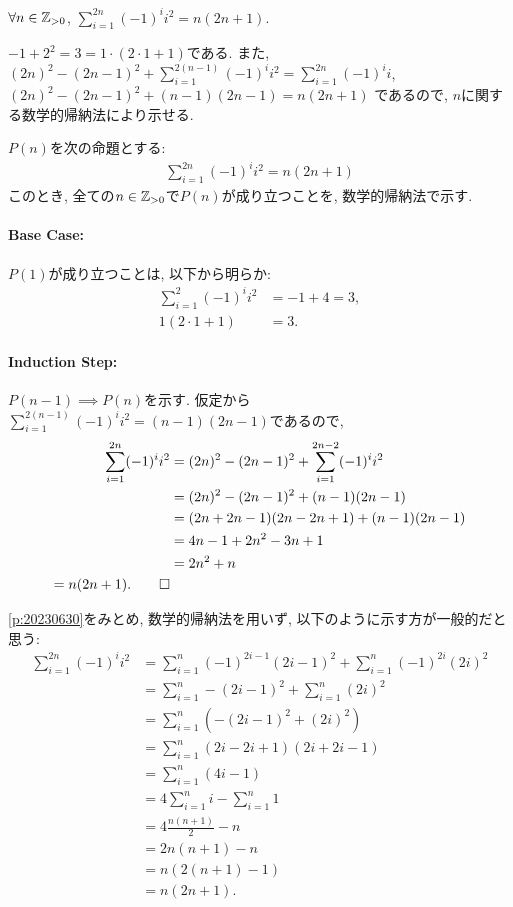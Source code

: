 \begin{prop}
  \label{p:20230709}
  $\forall n\in\mathbb{Z}_{>0}$, $\sum_{i=1}^{2n}(-1)^ii^2=n(2n+1)$.
\end{prop}
\begin{proof**}
  $-1+2^2=3=1\cdot (2\cdot 1+1)$である.
  また,
    $(2n)^2-(2n-1)^2+\sum_{i=1}^{2(n-1)}(-1)^ii^2=\sum_{i=1}^{2n}(-1)^ii$,
    $(2n)^2-(2n-1)^2+(n-1)(2n-1)=n(2n+1)$
  であるので,
  $n$に関する数学的帰納法により示せる.
\end{proof**}
\begin{proof*}
  $P(n)$を次の命題とする:
  \begin{align*}
    \sum_{i=1}^{2n}(-1)^ii^2=n(2n+1)
  \end{align*}
  このとき,
  全ての$n\in\mathbb{Z}_{>0}$で$P(n)$が成り立つことを,
  数学的帰納法で示す.

  \paragraph{Base Case:}
  $P(1)$が成り立つことは, 以下から明らか:
  \begin{align*}
    \sum_{i=1}^{2}(-1)^ii^2&=-1+4=3,\\
    1(2\cdot 1+1)&=3.
  \end{align*}

  \paragraph{Induction Step:}
  $P(n-1)\implies P(n)$を示す.
  仮定から$\sum_{i=1}^{2(n-1)}(-1)^ii^2=(n-1)(2n-1)$であるので,
  \begin{align*}
    \sum_{i=1}^{2n}(-1)^ii^2&=(2n)^2-(2n-1)^2+\sum_{i=1}^{2n-2}(-1)^ii^2\\
    &=(2n)^2-(2n-1)^2+(n-1)(2n-1)\\
    &=(2n+2n-1)(2n-2n+1)+(n-1)(2n-1)\\
    &=4n-1+2n^2-3n+1\\
    &=2n^2+n\\
    =n(2n+1)
    .\qedhere
  \end{align*}
\end{proof*}

\begin{rem}
  \cref{p:20230630}をみとめ,
  数学的帰納法を用いず, 以下のように示す方が一般的だと思う:
  \begin{align*}
    \sum_{i=1}^{2n}(-1)^ii^2
    &=\sum_{i=1}^{n}(-1)^{2i-1}(2i-1)^2+\sum_{i=1}^{n}(-1)^{2i}(2i)^2\\
    &=\sum_{i=1}^{n}-(2i-1)^2+\sum_{i=1}^{n}(2i)^2\\
    &=\sum_{i=1}^{n}(-(2i-1)^2+(2i)^2)\\
    &=\sum_{i=1}^{n}(2i-2i+1)(2i+2i-1)\\
    &=\sum_{i=1}^{n}(4i-1)\\
    &=4\sum_{i=1}^{n}i-\sum_{i=1}^{n}1\\
    &=4\frac{n(n+1)}{2}-n\\
    &=2n(n+1)-n\\
    &=n(2(n+1)-1)\\
    &=n(2n+1).
  \end{align*}
\end{rem}


